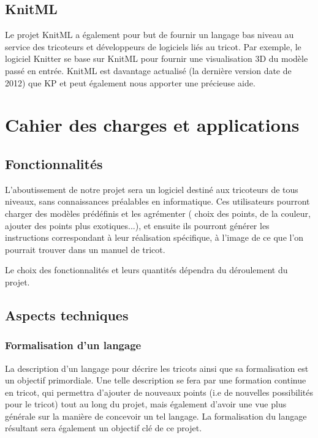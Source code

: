 \documentclass{article}
\begin{document}
\subsection{KnitML}

Le projet KnitML a également pour but de fournir un langage bas niveau au service des tricoteurs et développeurs de logiciels liés au
tricot. Par exemple, le logiciel Knitter se base sur KnitML pour fournir une visualisation 3D du modèle passé en entrée. KnitML est 
davantage actualisé (la dernière version date de 2012) que KP et peut également nous apporter une précieuse aide.


\section{Cahier des charges et applications}

\subsection{Fonctionnalités}

L'aboutissement de notre projet sera un logiciel destiné aux tricoteurs de tous niveaux, sans connaissances préalables en informatique. 
Ces utilisateurs pourront charger des modèles prédéfinis et les agrémenter ( choix des points, de la couleur, ajouter des points plus 
exotiques...), et ensuite ils pourront générer les instructions correspondant à leur réalisation spécifique, à l'image de ce que l'on 
pourrait trouver dans un manuel de tricot.

Le choix des fonctionnalités et leurs quantités dépendra du déroulement du projet.

\subsection{Aspects techniques}


\subsubsection{Formalisation d'un langage}

La description d'un langage pour décrire les tricots ainsi que sa formalisation est un objectif primordiale.
Une telle description se fera par une formation continue en tricot, qui permettra d'ajouter de nouveaux points (i.e de nouvelles
possibilités pour le tricot) tout au long du projet, mais également d'avoir une vue plus générale sur la manière de concevoir un tel
langage. La formalisation du langage résultant sera également un objectif clé de ce projet.
\end{document}
